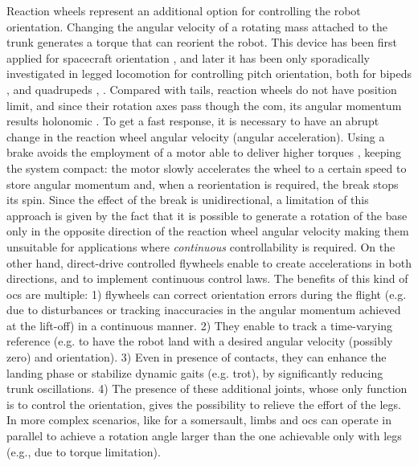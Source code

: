 \documentclass[letterpaper, 10 pt, conference]{ieeeconf}  %
\begin{document}
Reaction wheels represent an additional option for controlling the robot orientation.
Changing the angular velocity of a rotating mass attached to the trunk generates a torque that can reorient the robot. This device has been first applied for spacecraft orientation \cite{oland2009reaction}, and later it has been only sporadically investigated in legged locomotion for controlling pitch orientation, both for bipeds \cite{Brown2016}, \cite{xiong2020sequential} and quadrupeds \cite{kolvenbach2019towards}, \cite{vasilopoulos2016quadruped}.
Compared with tails, reaction wheels do not have position limit, and since their rotation axes pass though the \gls{com}, its angular momentum results holonomic \cite{machairas2015quadruped}.
To get a fast response, it is necessary to have an abrupt change in the reaction wheel angular velocity (angular acceleration).
Using a brake avoids the employment of a motor able to deliver higher torques \cite{gajamohan2012cubli}, 
keeping the system compact: the motor slowly accelerates the wheel to a certain speed to store angular momentum and, when a reorientation is required, the break stops its spin.
Since the effect of the break is unidirectional, a limitation of this approach is given by the fact that it is possible to generate a rotation of the base only in the opposite direction of the reaction wheel angular velocity making them unsuitable for applications where \textit{continuous} controllability is required. On the other hand, direct-drive controlled flywheels enable to create accelerations in both directions,  and  to implement continuous control laws. The benefits of this kind of  \gls{ocs} are multiple: 1) flywheels can correct orientation errors during the flight (e.g. due to disturbances or tracking inaccuracies in the angular momentum achieved at the lift-off)   %
in a continuous manner. 2) They enable to track a time-varying reference (e.g. to have the robot land with a desired angular velocity (possibly zero) and orientation).
3) Even in presence of contacts, they can enhance the landing phase or stabilize dynamic gaits (e.g. trot), by significantly reducing trunk oscillations.  
4) The presence of these additional joints, whose only function is to control the orientation, gives the possibility to relieve the effort of the legs.
In more complex scenarios, like for a somersault, limbs and \gls{ocs} can operate in parallel to achieve a rotation angle larger than the one achievable only with legs (e.g., due to torque limitation). 
\end{document}
